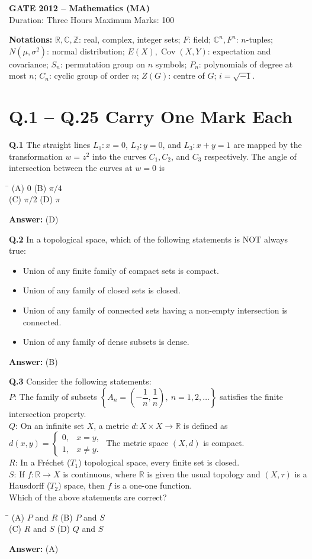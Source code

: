\documentclass[11pt,a4paper]{article}
\newcommand{\optsfourA}[4]{%
  \begin{tabbing}
    \hspace{0.48\linewidth}\=\kill
    (A) #1 \> (B) #2 \\[2pt]
    (C) #3 \> (D) #4
  \end{tabbing}%
}
\newcommand{\optslistA}[4]{%
  \begin{itemize}
    \setlength{\itemsep}{2pt}\setlength{\parskip}{0pt}
    \item[(A)] #1
    \item[(B)] #2
    \item[(C)] #3
    \item[(D)] #4
  \end{itemize}%
}
\newcommand{\ans}[1]{\textbf{Answer:} #1\par\medskip}
\begin{document}

\begin{center}
  {\Large\bfseries GATE 2012 -- Mathematics (MA)}\\[4pt]
  {\small Duration: Three Hours \quad\textbar\quad Maximum Marks: 100}
\end{center}

\medskip
\textbf{Notations:} $\mathbb{R}, \mathbb{C}, \mathbb{Z}$: real, complex, integer sets; $F$: field; $\mathbb{C}^n, F^n$: $n$-tuples; $N(\mu, \sigma^2)$: normal distribution; $E(X), \operatorname{Cov}(X,Y)$: expectation and covariance; $S_n$: permutation group on $n$ symbols; $P_n$: polynomials of degree at most $n$; $C_n$: cyclic group of order $n$; $Z(G)$: centre of $G$; $i = \sqrt{-1}$.

\section*{Q.1 -- Q.25 Carry One Mark Each}

\textbf{Q.1} The straight lines $L_1 : x = 0$, $L_2 : y = 0$, and $L_3 : x + y = 1$ are mapped by the transformation $w = z^2$ into the curves $C_1, C_2$, and $C_3$ respectively. The angle of intersection between the curves at $w = 0$ is
\optsfourA{$0$}{$\pi/4$}{$\pi/2$}{$\pi$}
\ans{(D)}

\textbf{Q.2} In a topological space, which of the following statements is NOT always true:
\optslistA{Union of any finite family of compact sets is compact.}{Union of any family of closed sets is closed.}{Union of any family of connected sets having a non-empty intersection is connected.}{Union of any family of dense subsets is dense.}
\ans{(B)}

\textbf{Q.3} Consider the following statements:\\
$P$: The family of subsets $\left\{A_n = \left(-\dfrac{1}{n}, \dfrac{1}{n}\right),\ n = 1, 2, \dots\right\}$ satisfies the finite intersection property.\\
$Q$: On an infinite set $X$, a metric $d : X \times X \to \mathbb{R}$ is defined as $d(x, y) = \begin{cases} 0, & x = y, \\ 1, & x \ne y. \end{cases}$ The metric space $(X, d)$ is compact.\\
$R$: In a Fr\'echet ($T_1$) topological space, every finite set is closed.\\
$S$: If $f : \mathbb{R} \to X$ is continuous, where $\mathbb{R}$ is given the usual topology and $(X, \tau)$ is a Hausdorff ($T_2$) space, then $f$ is a one-one function.\\
Which of the above statements are correct?
\optsfourA{$P$ and $R$}{$P$ and $S$}{$R$ and $S$}{$Q$ and $S$}
\ans{(A)}
\end{document}
